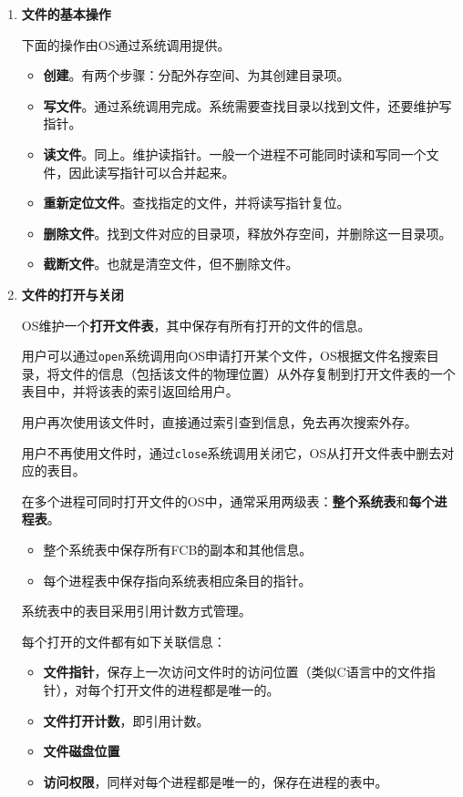 \documentclass[12pt, a4paper, oneside]{ctexart}
\begin{document}
\begin{enumerate}
  \item {\bf 文件的基本操作}
  
  下面的操作由OS通过系统调用提供。

  \begin{itemize}
    \item {\bf 创建}。有两个步骤：分配外存空间、为其创建目录项。
    \item {\bf 写文件}。通过系统调用完成。系统需要查找目录以找到文件，还要维护写指针。
    \item {\bf 读文件}。同上。维护读指针。一般一个进程不可能同时读和写同一个文件，因此读写指针可以合并起来。
    \item {\bf 重新定位文件}。查找指定的文件，并将读写指针复位。
    \item {\bf 删除文件}。找到文件对应的目录项，释放外存空间，并删除这一目录项。
    \item {\bf 截断文件}。也就是清空文件，但不删除文件。
  \end{itemize}

  \item {\bf 文件的打开与关闭}
  
  OS维护一个\textbf{打开文件表}，其中保存有所有打开的文件的信息。
  
  用户可以通过\verb|open|系统调用向OS申请打开某个文件，OS根据文件名搜索目录，将文件的信息（包括该文件的物理位置）从外存复制到打开文件表的一个表目中，并将该表的索引返回给用户。
  
  用户再次使用该文件时，直接通过索引查到信息，免去再次搜索外存。
  
  用户不再使用文件时，通过\verb|close|系统调用关闭它，OS从打开文件表中删去对应的表目。

  在多个进程可同时打开文件的OS中，通常采用两级表：\textbf{整个系统表}和\textbf{每个进程表}。
  \begin{itemize}
    \item 整个系统表中保存所有FCB的副本和其他信息。
    \item 每个进程表中保存指向系统表相应条目的指针。
  \end{itemize}

  系统表中的表目采用引用计数方式管理。

  每个打开的文件都有如下关联信息：
  \begin{itemize}
    \item {\bf 文件指针}，保存上一次访问文件时的访问位置（类似C语言中的文件指针），对每个打开文件的进程都是唯一的。
    \item {\bf 文件打开计数}，即引用计数。
    \item {\bf 文件磁盘位置}
    \item {\bf 访问权限}，同样对每个进程都是唯一的，保存在进程的表中。
  \end{itemize}
\end{enumerate}
\end{document}
